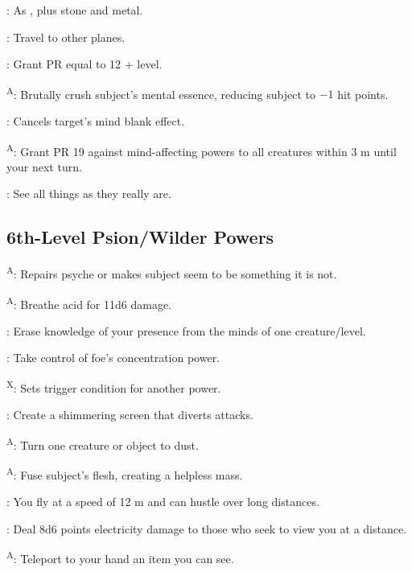 : As , plus stone and metal.

: Travel to other planes.

: Grant PR equal to 12 + level.

\textsuperscript{A}: Brutally crush subject's mental essence, reducing subject to $-1$ hit points.

: Cancels target's mind blank effect.

\textsuperscript{A}: Grant PR 19 against mind-affecting powers to all creatures within 3 m until your next turn.

: See all things as they really are.




\subsection{6th-Level Psion/Wilder Powers}

\textsuperscript{A}: Repairs psyche or makes subject seem to be something it is not.

\textsuperscript{A}: Breathe acid for 11d6 damage.

: Erase knowledge of your presence from the minds of one creature/level.

: Take control of foe's concentration power.

\textsuperscript{X}: Sets trigger condition for another power.

: Create a shimmering screen that diverts attacks.

\textsuperscript{A}: Turn one creature or object to dust.

\textsuperscript{A}: Fuse subject's flesh, creating a helpless mass.

: You fly at a speed of 12 m and can hustle over long distances.

: Deal 8d6 points electricity damage to those who seek to view you at a distance.

\textsuperscript{A}: Teleport to your hand an item you can see.

